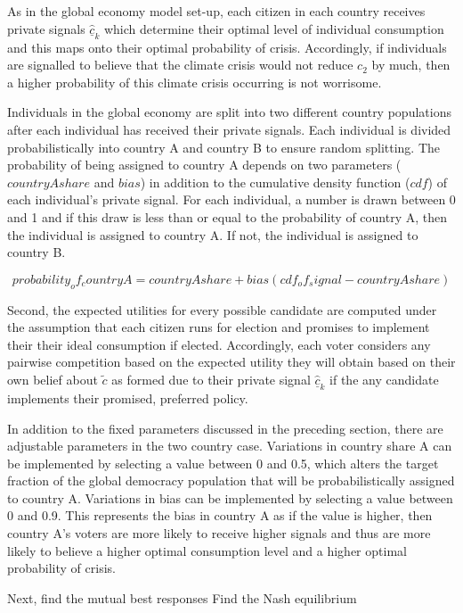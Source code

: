 \documentclass[11pt,preprint, authoryear]{elsarticle}
\numberwithin{equation}{section}
\numberwithin{figure}{section}
\numberwithin{table}{section}
\begin{document}
As in the global economy model set-up, each citizen in each country
receives private signals \(\hat{\underline{c}}_k\) which determine their
optimal level of individual consumption and this maps onto their optimal
probability of crisis. Accordingly, if individuals are signalled to
believe that the climate crisis would not reduce \(c_2\) by much, then a
higher probability of this climate crisis occurring is not worrisome.

Individuals in the global economy are split into two different country
populations after each individual has received their private signals.
Each individual is divided probabilistically into country A and country
B to ensure random splitting. The probability of being assigned to
country A depends on two parameters (\(countryAshare\) and \(bias\)) in
addition to the cumulative density function (\(cdf\)) of each
individual's private signal. For each individual, a number is drawn
between 0 and 1 and if this draw is less than or equal to the
probability of country A, then the individual is assigned to country A.
If not, the individual is assigned to country B.

\[probability_of_country A = country A share + bias(cdf_of_signal - country A share)\]

Second, the expected utilities for every possible candidate are computed
under the assumption that each citizen runs for election and promises to
implement their their ideal consumption if elected. Accordingly, each
voter considers any pairwise competition based on the expected utility
they will obtain based on their own belief about \(\tilde{c}\) as formed
due to their private signal \(\hat{\underline{c}}_k\) if the any
candidate implements their promised, preferred policy.

In addition to the fixed parameters discussed in the preceding section,
there are adjustable parameters in the two country case. Variations in
country share A can be implemented by selecting a value between 0 and
0.5, which alters the target fraction of the global democracy population
that will be probabilistically assigned to country A. Variations in bias
can be implemented by selecting a value between 0 and 0.9. This
represents the bias in country A as if the value is higher, then country
A's voters are more likely to receive higher signals and thus are more
likely to believe a higher optimal consumption level and a higher
optimal probability of crisis.

Next, find the mutual best responses Find the Nash equilibrium
\end{document}
